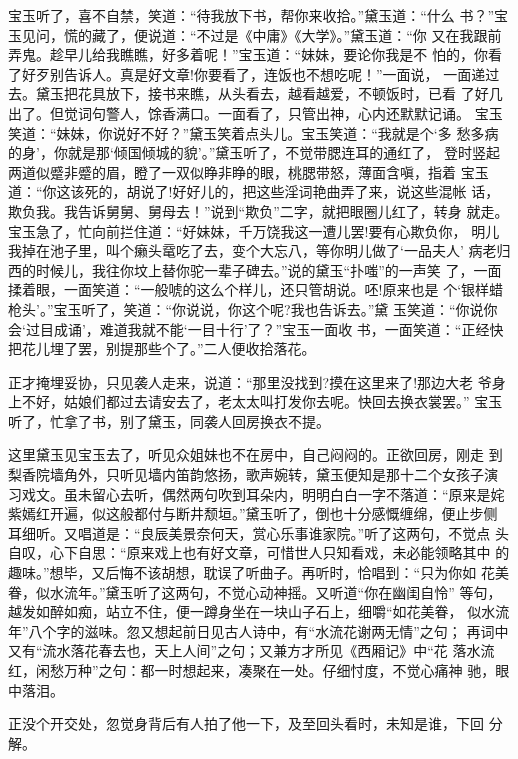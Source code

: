 宝玉听了，喜不自禁，笑道：“待我放下书，帮你来收拾。”黛玉道：“什么
书？”宝玉见问，慌的藏了，便说道：“不过是《中庸》《大学》。”黛玉道：“你
又在我跟前弄鬼。趁早儿给我瞧瞧，好多着呢！”宝玉道：“妹妹，要论你我是不
怕的，你看了好歹别告诉人。真是好文章!你要看了，连饭也不想吃呢！”一面说，
一面递过去。黛玉把花具放下，接书来瞧，从头看去，越看越爱，不顿饭时，已看
了好几出了。但觉词句警人，馀香满口。一面看了，只管出神，心内还默默记诵。
宝玉笑道：“妹妹，你说好不好？”黛玉笑着点头儿。宝玉笑道：“我就是个‘多
愁多病的身’，你就是那‘倾国倾城的貌’。”黛玉听了，不觉带腮连耳的通红了，
登时竖起两道似蹙非蹙的眉，瞪了一双似睁非睁的眼，桃腮带怒，薄面含嗔，指着
宝玉道：“你这该死的，胡说了!好好儿的，把这些淫词艳曲弄了来，说这些混帐
话，欺负我。我告诉舅舅、舅母去！”说到“欺负”二字，就把眼圈儿红了，转身
就走。宝玉急了，忙向前拦住道：“好妹妹，千万饶我这一遭儿罢!要有心欺负你，
明儿我掉在池子里，叫个癞头鼋吃了去，变个大忘八，等你明儿做了‘一品夫人’
病老归西的时候儿，我往你坟上替你驼一辈子碑去。”说的黛玉“扑嗤”的一声笑
了，一面揉着眼，一面笑道：“一般唬的这么个样儿，还只管胡说。呸!原来也是
个‘银样蜡枪头’。”宝玉听了，笑道：“你说说，你这个呢?我也告诉去。”黛
玉笑道：“你说你会‘过目成诵’，难道我就不能‘一目十行’了？”宝玉一面收
书，一面笑道：“正经快把花儿埋了罢，别提那些个了。”二人便收拾落花。

正才掩埋妥协，只见袭人走来，说道：“那里没找到?摸在这里来了!那边大老
爷身上不好，姑娘们都过去请安去了，老太太叫打发你去呢。快回去换衣裳罢。”
宝玉听了，忙拿了书，别了黛玉，同袭人回房换衣不提。

这里黛玉见宝玉去了，听见众姐妹也不在房中，自己闷闷的。正欲回房，刚走
到梨香院墙角外，只听见墙内笛韵悠扬，歌声婉转，黛玉便知是那十二个女孩子演
习戏文。虽未留心去听，偶然两句吹到耳朵内，明明白白一字不落道：“原来是姹
紫嫣红开遍，似这般都付与断井颓垣。”黛玉听了，倒也十分感慨缠绵，便止步侧
耳细听。又唱道是：“良辰美景奈何天，赏心乐事谁家院。”听了这两句，不觉点
头自叹，心下自思：“原来戏上也有好文章，可惜世人只知看戏，未必能领略其中
的趣味。”想毕，又后悔不该胡想，耽误了听曲子。再听时，恰唱到：“只为你如
花美眷，似水流年。”黛玉听了这两句，不觉心动神摇。又听道“你在幽闺自怜”
等句，越发如醉如痴，站立不住，便一蹲身坐在一块山子石上，细嚼“如花美眷，
似水流年”八个字的滋味。忽又想起前日见古人诗中，有“水流花谢两无情”之句；
再词中又有“流水落花春去也，天上人间”之句；又兼方才所见《西厢记》中“花
落水流红，闲愁万种”之句：都一时想起来，凑聚在一处。仔细忖度，不觉心痛神
驰，眼中落泪。

正没个开交处，忽觉身背后有人拍了他一下，及至回头看时，未知是谁，下回
分解。